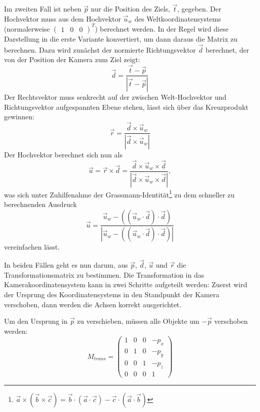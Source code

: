 Im zweiten Fall ist neben $\vec p$ nur die Position des Ziels, $\vec t$, gegeben. Der Hochvektor muss aus dem Hochvektor $\vec u_w$ des Weltkoordinatensystems (normalerweise $\begin{pmatrix} 1 & 0 & 0 \end{pmatrix}^T$) berechnet werden. In der Regel wird diese Darstellung in die erste Variante konvertiert, um dann daraus die Matrix zu berechnen. Dazu wird zunächst der normierte Richtungsvektor $\vec d$ berechnet, der von der Position der Kamera zum Ziel zeigt:
\begin{equation}
 \vec d = \frac{\vec t - \vec p}{\left| \vec t - \vec p \right|}
\end{equation}
Der Rechtsvektor muss senkrecht auf der zwischen Welt-Hochvektor und Richtungsvektor aufgespannten Ebene stehen, lässt sich über das Kreuzprodukt gewinnen:
\begin{equation}
 \vec r = \frac{\vec d \times \vec u_w}{\left| \vec d \times \vec u_w \right|}
\end{equation} 
Der Hochvektor berechnet sich nun als 
\begin{equation}
 \vec u = \vec r \times \vec d = \frac{\vec d \times \vec u_w \times \vec d}{\left| \vec d \times \vec u_w \times \vec d \right|},
\end{equation} 
was sich unter Zuhilfenahme der Grassmann-Identität\footnote{$\vec a \times ( \vec b \times \vec c ) = \vec b \cdot ( \vec a \cdot \vec c ) - \vec c \cdot ( \vec a \cdot \vec b)$} zu dem schneller zu berechnenden Ausdruck
\begin{equation}
 \vec u = \frac{\vec u_w - \left( \left( \vec u_w \cdot \vec d \right) \cdot \vec d \right)}{\left| \vec u_w - \left( \left( \vec u_w \cdot \vec d \right) \cdot \vec d \right) \right|}
\end{equation} 
vereinfachen lässt.

In beiden Fällen geht es nun darum, aus $\vec p$, $\vec d$, $\vec u$ und $\vec r$ die Transformationsmatrix zu bestimmen. Die Transformation in das Kamerakoordinatensystem kann in zwei Schritte aufgeteilt werden: Zuerst wird der Ursprung des Koordinatensystems in den Standpunkt der Kamera verschoben, dann werden die Achsen korrekt ausgerichtet.

Um den Ursprung in $\vec p$ zu verschieben, müssen alle Objekte um $-\vec p$ verschoben werden:
\begin{equation}
 M_{trans} = \begin{pmatrix}
  1 & 0 & 0 & -p_x \\
  0 & 1 & 0 & -p_y \\
  0 & 0 & 1 & -p_z \\
  0 & 0 & 0 & 1
 \end{pmatrix}
\end{equation}

